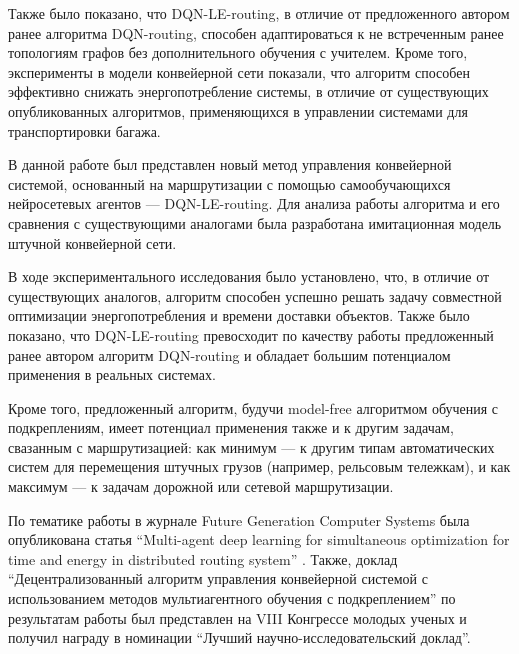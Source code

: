 \documentclass[specification,annotation,times]{itmo-student-thesis}
\theoremstyle{definition}
\begin{document}
Также было показано, что DQN-LE-routing, в отличие от предложенного автором
ранее алгоритма DQN-routing, способен адаптироваться к не встреченным ранее
топологиям графов без дополнительного обучения с учителем. Кроме того,
эксперименты в модели конвейерной сети показали, что алгоритм способен
эффективно снижать энергопотребление системы, в отличие от существующих
опубликованных алгоритмов, применяющихся в управлении системами для
транспортировки багажа.

\startconclusionpage

В данной работе был представлен новый метод управления конвейерной системой,
основанный на маршрутизации с помощью самообучающихся нейросетевых агентов ---
DQN-LE-routing. Для анализа работы алгоритма и его сравнения с существующими
аналогами была разработана имитационная модель штучной конвейерной сети.

В ходе экспериментального исследования было установлено, что, в отличие от
существующих аналогов, алгоритм способен успешно решать задачу совместной
оптимизации энергопотребления и времени доставки объектов. Также было показано,
что DQN-LE-routing превосходит по качеству работы предложенный ранее автором
алгоритм DQN-routing и обладает большим потенциалом применения в реальных системах.

Кроме того, предложенный алгоритм, будучи model-free алгоритмом обучения с
подкреплениям, имеет потенциал применения также и к другим задачам, свазанным с
маршрутизацией: как минимум --- к другим типам автоматических систем для
перемещения штучных грузов (например, рельсовым тележкам), и как максимум --- к
задачам дорожной или сетевой маршрутизации.

По тематике работы в журнале Future Generation Computer Systems была
опубликована статья ``Multi-agent deep learning for simultaneous optimization
for time and energy in distributed routing system'' \cite{mukhutdinov2019multi}.
Также, доклад ``Децентрализованный алгоритм управления конвейерной системой с
использованием методов мультиагентного обучения с подкреплением'' по результатам
работы был представлен на VIII Конгрессе молодых ученых
\cite{mukhutdinov2019kmu} и получил награду в номинации ``Лучший
научно-исследовательский доклад''.

\printmainbibliography




\end{document}
